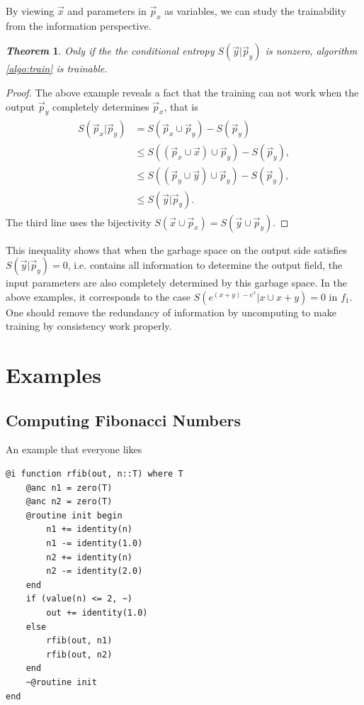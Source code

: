 \documentclass[aps,twocolumn,longbibliography,english,superscriptaddress]{revtex4-1}
\newcommand{\<}{\langle}
\renewcommand{\>}{\rangle}
\newcommand{\vx}{{\vec x}}
\newcommand{\vp}{{\vec p}}
\newcommand{\vy}{{\vec y}}
\newtheorem{theorem}{\textit{Theorem}}
\theoremstyle{definition}\newtheorem{definition}{\textit{Definition}}
\begin{document}
By viewing $\vx$ and parameters in $\vp_x$ as variables, we can study the trainability from the information perspective.
\begin{theorem}
    Only if the the conditional entropy $S(\vy|\vp_y)$ is nonzero, algorithm \ref{algo:train} is trainable.
\end{theorem}
\begin{proof}
The above example reveals a fact that the training can not work when the output $\vp_y$ completely determines $\vp_x$, that is
\begin{align}
    \begin{split}
        S(\vp_x | \vp_y) &= S(\vp_x \cup \vp_y) - S(\vp_y)\\
        &\leq S\left((\vp_x \cup \vx) \cup \vp_y \right) - S(\vp_y),\\
        &\leq S\left((\vp_y \cup \vy) \cup \vp_y\right) - S(\vp_y),\\
    &\leq S(\vy|\vp_y).
    \end{split}
\end{align}
The third line uses the bijectivity $S(\vx \cup \vp_x) = S(\vy \cup \vp_y)$.
\end{proof}
This inequality shows that when the garbage space on the output side satisfies $S(\vy | \vp_y) = 0$, i.e. contains all information to determine the output field, the input parameters are also completely determined by this garbage space.
In the above examples, it corresponds to the case $S\left(e^{(x+y)-e^x} | x \cup x + y\right) = 0$ in $f_1$.
One should remove the redundancy of information by uncomputing to make training by consistency work properly.

\section{Examples}\label{sec:example}

\subsection{Computing Fibonacci Numbers}\label{sec:fib}
An example that everyone likes

\begin{minipage}{.44\textwidth}
\begin{lstlisting}
@i function rfib(out, n::T) where T
    @anc n1 = zero(T)
    @anc n2 = zero(T)
    @routine init begin
        n1 += identity(n)
        n1 -= identity(1.0)
        n2 += identity(n)
        n2 -= identity(2.0)
    end
    if (value(n) <= 2, ~)
        out += identity(1.0)
    else
        rfib(out, n1)
        rfib(out, n2)
    end
    ~@routine init
end
\end{lstlisting}
\end{minipage}
\end{document}
